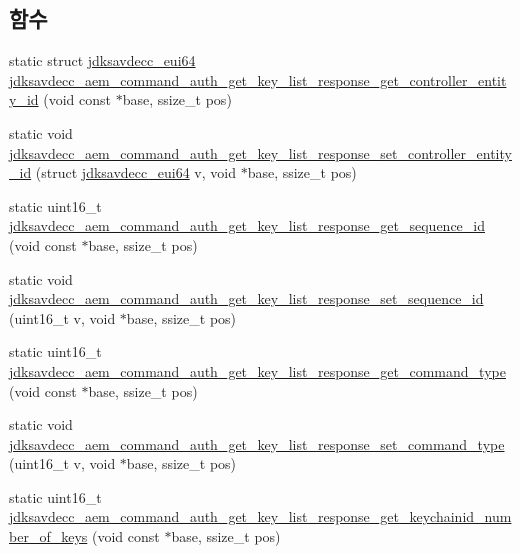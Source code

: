 \subsection*{함수}
\begin{DoxyCompactItemize}
\item 
static struct \hyperlink{structjdksavdecc__eui64}{jdksavdecc\+\_\+eui64} \hyperlink{group__command__auth__get__key__list__response_ga6f4a24b1efd985d5ebb4f8b29aa8482c}{jdksavdecc\+\_\+aem\+\_\+command\+\_\+auth\+\_\+get\+\_\+key\+\_\+list\+\_\+response\+\_\+get\+\_\+controller\+\_\+entity\+\_\+id} (void const $\ast$base, ssize\+\_\+t pos)
\item 
static void \hyperlink{group__command__auth__get__key__list__response_gaf4ff3a0543e00fbd4dfe4bc751df5928}{jdksavdecc\+\_\+aem\+\_\+command\+\_\+auth\+\_\+get\+\_\+key\+\_\+list\+\_\+response\+\_\+set\+\_\+controller\+\_\+entity\+\_\+id} (struct \hyperlink{structjdksavdecc__eui64}{jdksavdecc\+\_\+eui64} v, void $\ast$base, ssize\+\_\+t pos)
\item 
static uint16\+\_\+t \hyperlink{group__command__auth__get__key__list__response_ga7417ab99c9d86024f23ec4dda65c4789}{jdksavdecc\+\_\+aem\+\_\+command\+\_\+auth\+\_\+get\+\_\+key\+\_\+list\+\_\+response\+\_\+get\+\_\+sequence\+\_\+id} (void const $\ast$base, ssize\+\_\+t pos)
\item 
static void \hyperlink{group__command__auth__get__key__list__response_gaff699426a26c5d95f18c612f22bead03}{jdksavdecc\+\_\+aem\+\_\+command\+\_\+auth\+\_\+get\+\_\+key\+\_\+list\+\_\+response\+\_\+set\+\_\+sequence\+\_\+id} (uint16\+\_\+t v, void $\ast$base, ssize\+\_\+t pos)
\item 
static uint16\+\_\+t \hyperlink{group__command__auth__get__key__list__response_gaa48073f79c2178998c46b0d96e7ac030}{jdksavdecc\+\_\+aem\+\_\+command\+\_\+auth\+\_\+get\+\_\+key\+\_\+list\+\_\+response\+\_\+get\+\_\+command\+\_\+type} (void const $\ast$base, ssize\+\_\+t pos)
\item 
static void \hyperlink{group__command__auth__get__key__list__response_ga40e476783b05d6c21df968d93b81d762}{jdksavdecc\+\_\+aem\+\_\+command\+\_\+auth\+\_\+get\+\_\+key\+\_\+list\+\_\+response\+\_\+set\+\_\+command\+\_\+type} (uint16\+\_\+t v, void $\ast$base, ssize\+\_\+t pos)
\item 
static uint16\+\_\+t \hyperlink{group__command__auth__get__key__list__response_ga80e17c2dcbea2fad22b32a2b3a1098c1}{jdksavdecc\+\_\+aem\+\_\+command\+\_\+auth\+\_\+get\+\_\+key\+\_\+list\+\_\+response\+\_\+get\+\_\+keychainid\+\_\+number\+\_\+of\+\_\+keys} (void const $\ast$base, ssize\+\_\+t pos)

\end{DoxyCompactItemize}
